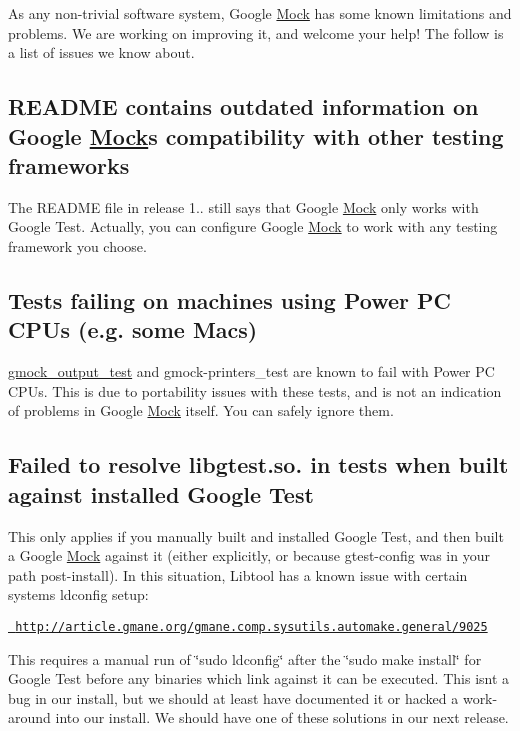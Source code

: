 As any non-\/trivial software system, Google \mbox{\hyperlink{classMock}{Mock}} has some known limitations and problems. We are working on improving it, and welcome your help! The follow is a list of issues we know about.

\subsection*{R\+E\+A\+D\+ME contains outdated information on Google \mbox{\hyperlink{classMock}{Mock}}\textquotesingle{}s compatibility with other testing frameworks}

The {\ttfamily R\+E\+A\+D\+ME} file in release 1.. still says that Google \mbox{\hyperlink{classMock}{Mock}} only works with Google Test. Actually, you can configure Google \mbox{\hyperlink{classMock}{Mock}} to work with any testing framework you choose.

\subsection*{Tests failing on machines using Power PC C\+P\+Us (e.\+g. some Macs)}

{\ttfamily \mbox{\hyperlink{namespacegmock__output__test}{gmock\+\_\+output\+\_\+test}}} and {\ttfamily gmock-\/printers\+\_\+test} are known to fail with Power PC C\+P\+Us. This is due to portability issues with these tests, and is not an indication of problems in Google \mbox{\hyperlink{classMock}{Mock}} itself. You can safely ignore them.

\subsection*{Failed to resolve libgtest.\+so. in tests when built against installed Google Test}

This only applies if you manually built and installed Google Test, and then built a Google \mbox{\hyperlink{classMock}{Mock}} against it (either explicitly, or because gtest-\/config was in your path post-\/install). In this situation, Libtool has a known issue with certain systems\textquotesingle{} ldconfig setup\+:

\href{http://article.gmane.org/gmane.comp.sysutils.automake.general/9025}{\texttt{ http\+://article.\+gmane.\+org/gmane.\+comp.\+sysutils.\+automake.\+general/9025}}

This requires a manual run of \char`\"{}sudo ldconfig\char`\"{} after the \char`\"{}sudo make install\char`\"{} for Google Test before any binaries which link against it can be executed. This isn\textquotesingle{}t a bug in our install, but we should at least have documented it or hacked a work-\/around into our install. We should have one of these solutions in our next release. 